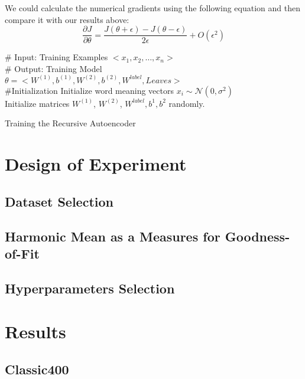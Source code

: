 \documentclass[twoside,12pt]{article}
\begin{document}
We could calculate the numerical gradients using the following equation and then compare it with our results above:
\begin{equation}
\frac{\partial J}{\partial \theta}=\frac{J(\theta+\epsilon)-J(\theta-\epsilon)}{2\epsilon}+O(\epsilon^2)
\end{equation}
\begin{algorithm}[h!]
\# Input: Training Examples $<x_1, x_2, \ldots, x_n>$\\ 
\# Output: Training Model\\$\theta=<W^{(1)},b^{(1)},W^{(2)},b^{(2)},W^{label},Leaves>$\\ 
\#Initialization
Initialize word meaning vectors $x_i \sim \mathcal{N}(0,\sigma^2)$\\
Initialize matrices $W^{(1)}$, $W^{(2)}$, $W^{label}, b^{1},b^{2}$ randomly.\\
\caption{Training the Recursive Autoencoder}
\label{algorithm RA}
\end{algorithm}


\section{Design of Experiment}
\subsection{Dataset Selection}
\subsection{Harmonic Mean  as a Measures for Goodness-of-Fit}
\subsection{Hyperparameters Selection}
\section{Results}
\subsection{Classic400}
\end{document}
